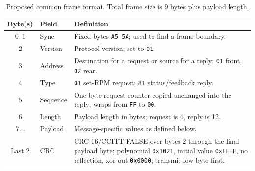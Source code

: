 \begin{table}[!htbp]
    \centering
    \small
    \begin{tabular}{clp{8.2cm}}
        \toprule
        \textbf{Byte(s)} & \textbf{Field} & \textbf{Definition} \\
        \midrule
        0--1 & Sync & Fixed bytes \texttt{A5 5A}; used to find a frame boundary. \\
        2 & Version & Protocol version; set to \texttt{01}. \\
        3 & Address & Destination for a request or source for a reply; \texttt{01} front, \texttt{02} rear. \\
        4 & Type & \texttt{01} set-RPM request; \texttt{81} status/feedback reply. \\
        5 & Sequence & One-byte request counter copied unchanged into the reply; wraps from \texttt{FF} to \texttt{00}. \\
        6 & Length & Payload length in bytes; request is 4, reply is 12. \\
        7... & Payload & Message-specific values as defined below. \\
        Last 2 & CRC & CRC-16/CCITT-FALSE over bytes 2 through the final payload byte; polynomial \texttt{0x1021}, initial value \texttt{0xFFFF}, no reflection, xor-out \texttt{0x0000}; transmit low byte first. \\
        \bottomrule
    \end{tabular}
    \caption{Proposed common frame format. Total frame size is 9 bytes plus payload length.}
    \label{tab:rs485_frame}
\end{table}

